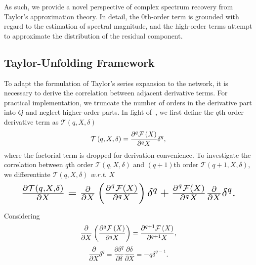 \documentclass{article}
\begin{document}
As such, we provide a novel perspective of complex spectrum recovery from Taylor's approximation theory. In detail, the 0th-order term is grounded with regard to the estimation of spectral magnitude, and the high-order terms attempt to approximate the distribution of the residual component.
\vspace{-3pt}
\subsection{Taylor-Unfolding Framework}
\label{sec:taylor-unfolding-framework}
To adapt the formulation of Taylor's series expansion to the network, it is necessary to derive the correlation between adjacent derivative terms. For practical implementation, we truncate the number of orders in the derivative part into $Q$ and neglect higher-order parts. In light of~{\cite{fu2021unfolding}}, we first define the $q$th order derivative term as $\mathcal{T}\left(q, X, \delta\right)$
\begin{equation}
\vspace{-0.05cm}
\label{eqn9}
\mathcal{T}\left(q, X, \delta\right) = \frac{\partial^{q}\mathcal{F}\left(X\right)}{\partial^{q} X}\delta^{q},
\vspace{-0.05cm}
\end{equation}
where the factorial term is dropped for derivation convenience. To investigate the correlation between $q$th order $\mathcal{T}\left(q, X, \delta\right)$ and $(q+1)$th order $\mathcal{T}\left(q+1, X, \delta\right)$, we differentiate $\mathcal{T}\left(q, X, \delta\right)$ \emph{w.r.t.} $X$
\begin{equation}
\label{eqn10}
\resizebox{0.90\linewidth}{!}{$
\frac{\partial\mathcal{T}\left(q,X,\delta\right)}{\partial X} = \frac{\partial}{\partial X}\left(\frac{\partial^{q}\mathcal{F}\left(X\right)}{\partial^{q} X}\right)\delta^{q} + \frac{\partial^{q}\mathcal{F}\left(X\right)}{\partial^{q} X}\frac{\partial}{\partial X}\delta^{q}.
$}
\end{equation}

Considering
\begin{equation}
\label{eqn11}
\frac{\partial}{\partial X}\left(\frac{\partial^{q}\mathcal{F}\left(X\right)}{\partial^{q} X}\right) = \frac{\partial^{q+1}\mathcal{F}\left(X\right)}{\partial^{q+1} X},
\vspace{-0.05cm}
\end{equation}
\begin{equation}
\label{eqn12}
\frac{\partial}{\partial X}\delta^{q} = \frac{\partial\delta^{q}}{\partial \delta}\frac{\partial\delta}{\partial X} = -q\delta^{q-1}.
\end{equation}
\end{document}
